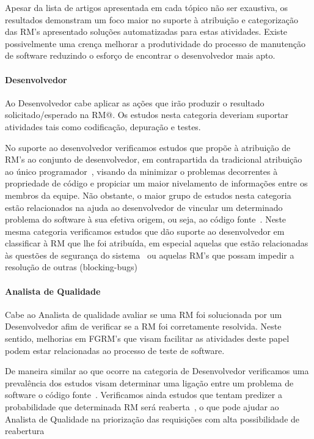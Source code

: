 Apesar da lista de artigos apresentada em cada tópico não ser exaustiva, os
resultados demonstram um foco maior no suporte à atribuição e categorização das
RM's apresentado soluções automatizadas para estas atividades. Existe
possivelmente uma crença melhorar a produtividade do processo de manutenção de
software reduzindo o esforço de encontrar o desenvolvedor mais apto.

\paragraph{Desenvolvedor}
Ao Desenvolvedor cabe aplicar as ações que irão produzir o resultado
solicitado/esperado na RM@. Os estudos nesta categoria deveriam suportar
atividades tais como codificação, depuração e testes. 

No suporte ao desenvolvedor verificamos estudos que propõe à atribuição de RM's
ao conjunto de desenvolvedor, em contrapartida da tradicional atribuição ao
único programador~\cite{banitaan2013decoba}, visando da minimizar o problemas
decorrentes à propriedade de código e propiciar um maior nivelamento de
informações entre os membros da equipe. Não obstante, o maior grupo de estudos
nesta categoria estão relacionados na ajuda ao desenvolvedor de vincular um
determinado problema do software à sua efetiva origem, ou seja, ao código
fonte~\cite{corley2011recovering,Wong:2014:BBF:2705615.2706096,
	Thung:2014:BIT:2635868.2661678,Nguyen:2012:MAR:2393596.2393671,thung2013automatic,
	Romo:2015:TAT:2745802.2745833}. Neste mesma categoria verificamos estudos
que dão suporte ao desenvolvedor em classificar à RM que lhe foi atribuída, em
especial aquelas que estão relacionadas às questões de segurança do
sistema~\cite{gegick2010identifying} ou aquelas RM's que possam impedir a
resolução de outras
(blocking-bugs)~\cite{ValdiviaGarcia:2014:CPB:2597073.2597099}

\paragraph{Analista de Qualidade}
Cabe ao Analista de qualidade avaliar se uma RM foi solucionada por um
Desenvolvedor afim de verificar se a RM foi corretamente resolvida. Neste
sentido, melhorias em FGRM's que visam facilitar as atividades deste papel podem
estar relacionadas ao processo de teste de software.

De maneira similar ao que ocorre na categoria de Desenvolvedor verificamos uma
prevalência dos estudos visam determinar uma ligação entre um problema de
software o código
fonte~\cite{corley2011recovering,Wong:2014:BBF:2705615.2706096,
	Thung:2014:BIT:2635868.2661678,Nguyen:2012:MAR:2393596.2393671,thung2013automatic,
	Romo:2015:TAT:2745802.2745833}. Verificamos ainda estudos que tentam
predizer a probabilidade que determinada RM será
reaberta~\cite{xia2015automatic}, o que pode ajudar ao
Analista de Qualidade na priorização das requisições com alta possibilidade de
reabertura

